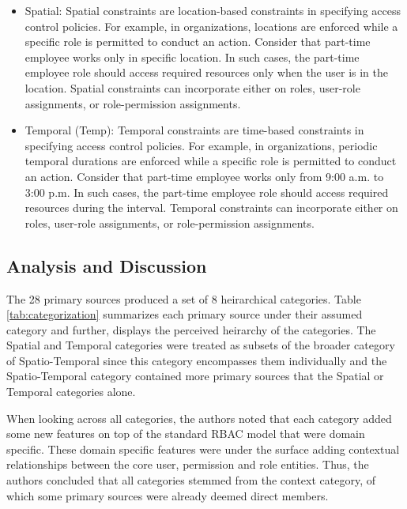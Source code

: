 \begin{itemize}
  \item Spatial:  Spatial constraints are location-based constraints in specifying access
	control policies. For example, in organizations, 	locations are enforced while a
	specific role is permitted to conduct an action. Consider that part-time employee works only in specific location.
	In such cases, the part-time employee role should access required resources only when the user is in the location. 
	Spatial constraints can incorporate either on roles, user-role assignments, or role-permission assignments. 

  \item Temporal (Temp):  Temporal constraints are time-based constraints in specifying access
	control policies. For example, in organizations, 	periodic temporal durations are enforced while a
	specific role is permitted to conduct an action. Consider that part-time employee works only from 9:00 a.m. to 3:00 p.m.
	In such cases, the part-time employee role should access required resources during the interval. 
	Temporal constraints can incorporate either on roles, user-role assignments, or role-permission assignments.   
	
\end{itemize}

\subsection{Analysis and Discussion}

The 28 primary sources produced a set of 8 heirarchical categories. Table \ref{tab:categorization} summarizes each primary source under their assumed
category and further, displays the perceived heirarchy of the categories. 
The Spatial and Temporal categories were treated as subsets of the broader category of Spatio-Temporal since this category encompasses them individually and
the Spatio-Temporal category contained more primary sources that the Spatial or Temporal categories alone.  

When looking across all categories, the authors noted that each category added some new features on top of the standard RBAC model that were domain specific.
These domain specific features were under the surface adding contextual relationships between the core user, permission and role entities.  Thus, the authors
concluded that all categories stemmed from the context category, of which some primary sources were already deemed direct members.  

